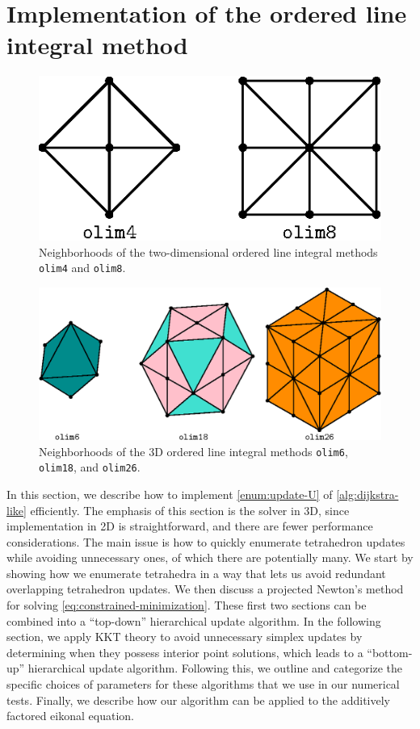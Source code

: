 \documentclass[eikonal.tex]{subfiles}
\begin{document}
  
\section{Implementation of the ordered line integral
  method}\label{sec:implementation}

\begin{figure}[t]
  \centering
  \includegraphics{neighborhood-2d.eps}
  \caption{Neighborhoods of the two-dimensional ordered line integral
    methods \texttt{olim4} and
    \texttt{olim8}.}\label{fig:neighborhood-2d}
\end{figure}

\begin{figure}[t]
  \centering
  \includegraphics{neighborhood-3d.eps}
  \caption{Neighborhoods of the 3D ordered line integral methods
    \texttt{olim6}, \texttt{olim18}, and
    \texttt{olim26}.}\label{fig:neighborhood-3d}
\end{figure}

In this section, we describe how to implement \cref{enum:update-U} of
\cref{alg:dijkstra-like} efficiently. The emphasis of this section is
the solver in 3D, since implementation in 2D is straightforward, and
there are fewer performance considerations. The main issue is how to
quickly enumerate tetrahedron updates while avoiding unnecessary ones,
of which there are potentially many. We start by showing how we
enumerate tetrahedra in a way that lets us avoid redundant overlapping
tetrahedron updates. We then discuss a projected Newton's method for
solving \cref{eq:constrained-minimization}. These first two sections
can be combined into a ``top-down'' hierarchical update algorithm. In
the following section, we apply KKT theory to avoid unnecessary
simplex updates by determining when they possess interior point
solutions, which leads to a ``bottom-up'' hierarchical update
algorithm. Following this, we outline and categorize the specific
choices of parameters for these algorithms that we use in our
numerical tests. Finally, we describe how our algorithm can be applied
to the additively factored eikonal equation.
\end{document}
